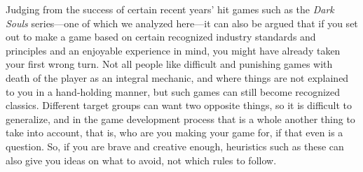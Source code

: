 Judging from the success of certain recent years' hit games such as the \textit{Dark Souls} series---one of which we analyzed here---it can also be argued that if you set out to make a game based on certain recognized industry standards and principles and an enjoyable experience in mind, you might have already taken your first wrong turn. Not all people like difficult and punishing games with death of the player as an integral mechanic, and where things are not explained to you in a hand-holding manner, but such games can still become recognized classics. Different target groups can want two opposite things, so it is difficult to generalize, and in the game development process that is a whole another thing to take into account, that is, who are you making your game for, if that even is a question. So, if you are brave and creative enough, heuristics such as these can also give you ideas on what to avoid, not which rules to follow.
